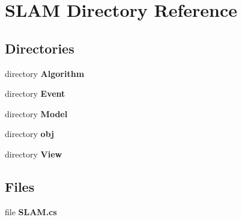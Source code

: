 \section{S\-L\-A\-M Directory Reference}
\label{dir_eac188b6573f2fe203d08bc11ad0b0b4}
\subsection*{Directories}
\begin{DoxyCompactItemize}
\item 
directory {\bf Algorithm}
\item 
directory {\bf Event}
\item 
directory {\bf Model}
\item 
directory {\bf obj}
\item 
directory {\bf View}
\end{DoxyCompactItemize}
\subsection*{Files}
\begin{DoxyCompactItemize}
\item 
file {\bf S\-L\-A\-M.\-cs}
\end{DoxyCompactItemize}
